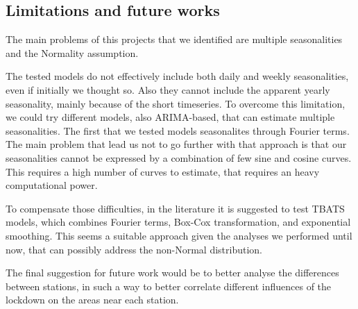 \documentclass[12pt]{article}
\begin{document}
\subsection{Limitations and future works}
The main problems of this projects that we identified are multiple seasonalities and the Normality assumption.

The tested models do not effectively include both daily and weekly seasonalities, even if initially we thought so. Also they cannot include the apparent yearly seasonality, mainly because of the short timeseries.
To overcome this limitation, we could try different models, also ARIMA-based, that can estimate multiple seasonalities. The first that we tested models seasonalites through Fourier terms. The main problem that lead us not to go further with that approach is that our seasonalities cannot be expressed by a combination of few sine and cosine curves. This requires a high number of curves to estimate, that requires an heavy computational power.

To compensate those difficulties, in the literature it is suggested to test TBATS models, which combines Fourier terms, Box-Cox transformation, and exponential smoothing. This seems a suitable approach given the analyses we performed until now, that can possibly address the non-Normal distribution.

The final suggestion for future work would be to better analyse the differences between stations, in such a way to better correlate different influences of the lockdown on the areas near each station.




\newpage

\end{document}
